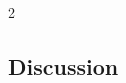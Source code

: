 \documentclass{article}
\begin{document}
\begin{multicols}{2}
\subsection{Discussion}



\end{multicols}
\end{document}
